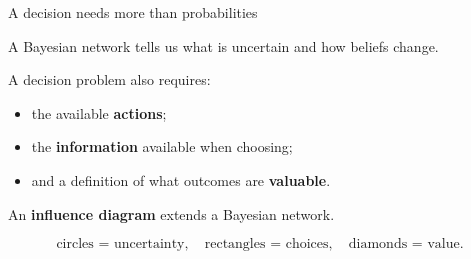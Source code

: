 \documentclass[aspectratio=43,11pt]{beamer}
\begin{document}
\begin{frame}{A decision needs more than probabilities}

A Bayesian network tells us what is uncertain and how beliefs change.

A decision problem also requires:

\begin{itemize}
  \item the available \textbf{actions};
  \item the \textbf{information} available when choosing;
  \item and a definition of what outcomes are \textbf{valuable}.
\end{itemize}

\medskip

An \textbf{influence diagram} extends a Bayesian network.

\begin{center}
\end{center}

\[
\text{circles = uncertainty},\quad
\text{rectangles = choices},\quad
\text{diamonds = value}.
\]

\end{frame}
\end{document}
